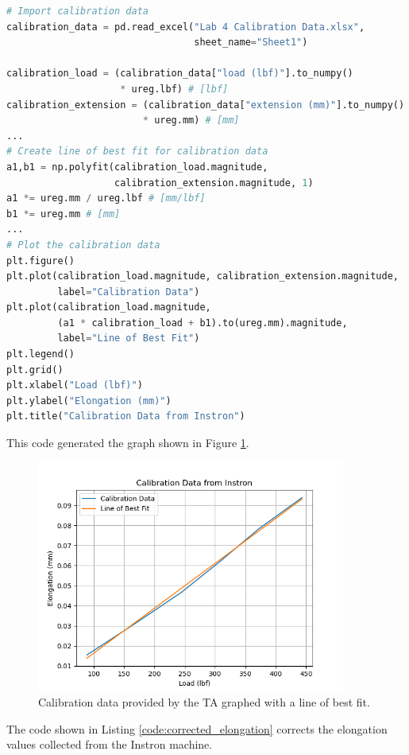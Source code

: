 \documentclass[12 pt]{report}
\begin{document}
\begin{parlist}
	\begin{lstlisting}[label={code:calibration_data}, caption={The code used to import the yellow box strain data and convert it to dimensionless strain.},language=Python]
# Import calibration data
calibration_data = pd.read_excel("Lab 4 Calibration Data.xlsx", 
                                 sheet_name="Sheet1")

calibration_load = (calibration_data["load (lbf)"].to_numpy()
                    * ureg.lbf) # [lbf]
calibration_extension = (calibration_data["extension (mm)"].to_numpy()
                        * ureg.mm) # [mm]
...
# Create line of best fit for calibration data
a1,b1 = np.polyfit(calibration_load.magnitude,
                   calibration_extension.magnitude, 1)
a1 *= ureg.mm / ureg.lbf # [mm/lbf]
b1 *= ureg.mm # [mm]
...
# Plot the calibration data
plt.figure()
plt.plot(calibration_load.magnitude, calibration_extension.magnitude,
         label="Calibration Data")
plt.plot(calibration_load.magnitude,
         (a1 * calibration_load + b1).to(ureg.mm).magnitude,
         label="Line of Best Fit")
plt.legend()
plt.grid()
plt.xlabel("Load (lbf)")
plt.ylabel("Elongation (mm)")
plt.title("Calibration Data from Instron")\end{lstlisting}
	
	This code generated the graph shown in Figure \ref{fig:calibration_data}.
	
	\begin{figure}[htbp]
		\centering
		\includegraphics[width=4in]{images/graphs/Calibration Data}
		\caption{Calibration data provided by the TA graphed with a line of best fit.}
		\label{fig:calibration_data}
	\end{figure}
	
	\item The code shown in Listing \ref{code:corrected_elongation} corrects the elongation values collected from the Instron machine.
	

\end{parlist}
\end{document}
